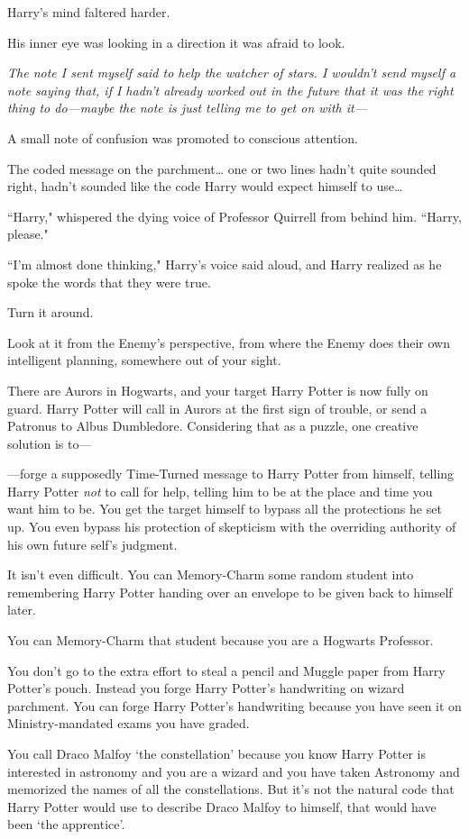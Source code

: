 Harry's mind faltered harder.

His inner eye was looking in a direction it was afraid to look.

\emph{The note I sent myself said to help the watcher of stars. I wouldn't send myself a note saying that, if I hadn't already worked out in the future that it was the right thing to do—maybe the note is just telling me to get on with it—}

A small note of confusion was promoted to conscious attention.

The coded message on the parchment{\ldots} one or two lines hadn't quite sounded right, hadn't sounded like the code Harry would expect himself to use{\ldots}

``Harry," whispered the dying voice of Professor Quirrell from behind him. ``Harry, please."

``I'm almost done thinking," Harry's voice said aloud, and Harry realized as he spoke the words that they were true.

Turn it around.

Look at it from the Enemy's perspective, from where the Enemy does their own intelligent planning, somewhere out of your sight.

There are Aurors in Hogwarts, and your target Harry Potter is now fully on guard. Harry Potter will call in Aurors at the first sign of trouble, or send a Patronus to Albus Dumbledore. Considering that as a puzzle, one creative solution is to—

—forge a supposedly Time-Turned message to Harry Potter from himself, telling Harry Potter \emph{not} to call for help, telling him to be at the place and time you want him to be. You get the target himself to bypass all the protections he set up. You even bypass his protection of skepticism with the overriding authority of his own future self's judgment.

It isn't even difficult. You can Memory-Charm some random student into remembering Harry Potter handing over an envelope to be given back to himself later.

You can Memory-Charm that student because you are a Hogwarts Professor.

You don't go to the extra effort to steal a pencil and Muggle paper from Harry Potter's pouch. Instead you forge Harry Potter's handwriting on wizard parchment. You can forge Harry Potter's handwriting because you have seen it on Ministry-mandated exams you have graded.

You call Draco Malfoy `the constellation' because you know Harry Potter is interested in astronomy and you are a wizard and you have taken Astronomy and memorized the names of all the constellations. But it's not the natural code that Harry Potter would use to describe Draco Malfoy to himself, that would have been `the apprentice'.


